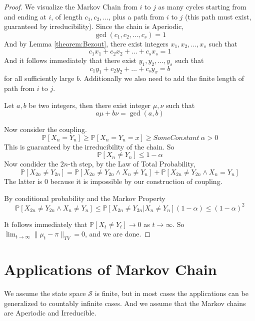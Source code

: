 \begin{proof}
        We visualize the Markov Chain from $i$ to $j$ as many cycles starting from and ending at $i$, of length $c_1,c_2,\dots$, plus a path from $i$ to $j$ (this path must exist, guaranteed by irreducibility). Since the chain is Aperiodic,
        \[ \gcd(c_1, c_2,\dots,c_s) = 1 \]
        And by Lemma \ref{theorem:Bezout}, there exist integers $x_1,x_2,\dots,x_s$ such that
        \[ c_1x_1 + c_2x_2 + \dots + c_sx_s = 1 \]
        And it follows immediately that there exist $y_1,y_2,\dots,y_s$ such that
        \[ c_1y_1 + c_2y_2 + \dots + c_sy_x = b \]
        for all sufficiently large $b$. Additionally we also need to add the finite length of path from $i$ to $j$.

        \begin{lemma}\label{theorem:Bezout}
            Let $a,b$ be two integers, then there exist integer $\mu, \nu$ such that
            \[ a\mu + b\nu = \gcd(a,b) \]
        \end{lemma}

        Now consider the coupling.
        \[ \mathbb{P}[X_n = Y_n] \ge \mathbb{P}[X_n=Y_n=x] \ge SomeConstant~{} \alpha > 0 \]
        This is guaranteed by the irreducibility of the chain.
        So
        \[ \mathbb{P}[X_n \neq Y_n] \le 1 - \alpha \]
        Now condider the $2n$-th step, by the Law of Total Probability,
        \[ \mathbb{P}[X_{2n} \neq Y_{2n}] = \mathbb{P}[X_{2n} \neq Y_{2n} \wedge X_n \neq Y_n] + \mathbb{P}[X_{2n} \neq Y_{2n} \wedge X_n = Y_n] \]
        The latter is $0$ because it is impossible by our construction of coupling.
        
        By conditional probability and the Markov Property
        \[ \mathbb{P}[X_{2n} \neq Y_{2n} \wedge X_n \neq Y_n] \le \mathbb{P}[X_{2n} \neq Y_{2n} | X_n \neq Y_n](1-\alpha) \le (1-\alpha)^2 \]

        It follows immediately that $\mathbb{P}[X_t \neq Y_t] \to 0$ as $t \to \infty$. So $\lim_{t\to\infty}\|\mu_t - \pi\|_{TV} = 0$, and we are done.
    \end{proof}


\section{Applications of Markov Chain}
    We assume the state space $\mathcal{S}$ is finite, but in most cases the applications can be generalized to countably infinite cases. And we assume that the Markov chains are Aperiodic and Irreducible.

